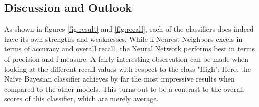 

\subsection{Discussion and Outlook}

As shown in figures \ref{fig:result} and \ref{fig:recall}, each of the
classifiers does indeed have its own strengths and weaknesses.
While k-Nearest Neighbors excels in terms of accuracy and overall
recall, the Neural Network performs best in terms of precision and
f-measure. A fairly interesting observation can be made when looking
at the different recall values with respect to the class "High":
Here, the Na\"ive Bayesian classifier achieves by far the most impressive
results when compared to the other models. This turns out to be a
contrast to the overall scores of this classifier, which are merely average.

